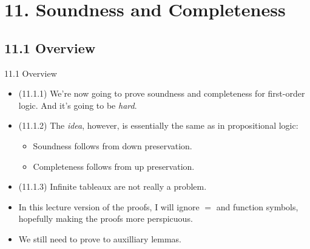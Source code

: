 \section{11. Soundness and Completeness}
\subsection{11.1 Overview}

\begin{frame}{11.1 Overview}

	\begin{itemize}
		
        \item (11.1.1) We're now going to prove soundness and
          completeness for first-order logic. And it's going to be
          \emph{hard}.

          \item (11.1.2) The \emph{idea}, however, is essentially the
            same as in propositional logic:
            \begin{itemize}

            \item Soundness follows from down preservation.

            \item Completeness follows from up preservation.

            \end{itemize}

          \item (11.1.3) Infinite tableaux are not really a problem.

           \item In this lecture version of the proofs, I will ignore
             $=$ and function symbols, hopefully making the proofs
             more perspicuous.

            \item We still need to prove to auxilliary lemmas.
          
	\end{itemize}

\end{frame}

